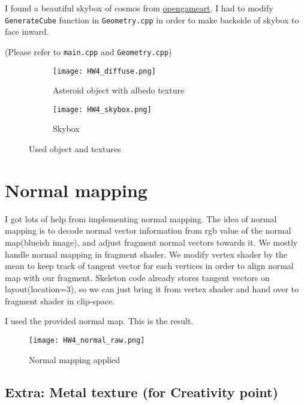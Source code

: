 \documentclass[10pt,a4paper]{article}
\begin{document}
	I found a beautiful skybox of cosmos from \href{https://opengameart.org/content/space-skyboxes-0}{opengameart}. I had to modify \texttt{GenerateCube} function in \texttt{Geometry.cpp} in order to make backside of skybox to face inward.

	
	\begin{flushright}
		(Please refer to \texttt{main.cpp} and \texttt{Geometry.cpp})
	\end{flushright}

	\begin{figure}[h]
		\begin{subfigure}{0.5\linewidth}
			\centering
			\texttt{[image: HW4\_diffuse.png]}
			\caption{Asteroid object with albedo texture}
			\label{fig:diffuse}
		\end{subfigure}
		\begin{subfigure}{0.5\linewidth}
			\centering
			\texttt{[image: HW4\_skybox.png]}
			\caption{Skybox}
			\label{fig:skybox}
		\end{subfigure}
		\caption{Used object and textures}
		\label{fig:shader}
	\end{figure}	

	\section{Normal mapping}
	
	I got lots of help from \cite{normal_map} implementing normal mapping. The idea of normal mapping is to decode normal vector information from rgb value of the normal map(blueish image), and adjust fragment normal vectors towards it. We mostly handle normal mapping in fragment shader. We modify vertex shader by the mean to keep track of tangent vector for each vertices in order to align normal map with our fragment. Skeleton code already stores tangent vectors on layout(location=3), so we can just bring it from vertex shader and hand over to fragment shader in clip-space.
	
	I used the provided normal map.	This is the result.
	
	\begin{figure}[h]
		\centering
		\texttt{[image: HW4\_normal\_raw.png]}
		\caption{Normal mapping applied}
		\label{fig:normal}
	\end{figure}	

	\subsection{Extra: Metal texture (for Creativity point)}\label{creativity}
	
\end{document}
